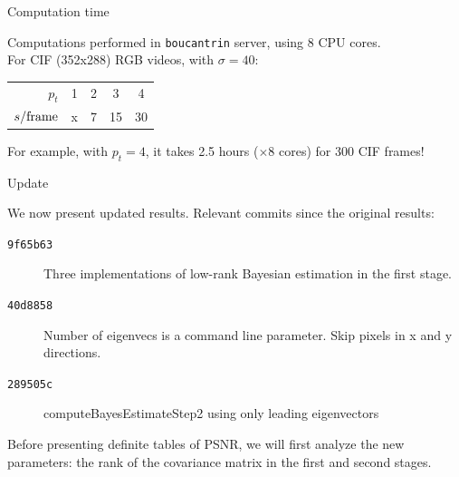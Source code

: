 \documentclass[mathserif, 8pt]{beamer}
\begin{document}
\begin{frame}{Computation time}

	Computations performed in \texttt{boucantrin} server, using 8 CPU cores.\\
	For CIF (352x288) RGB videos, with $\sigma = 40$: 

	\bigskip

	\begin{center}
	\begin{tabular}{r | c c c c}
		$p_t$ & 1 & 2 & 3 & 4 \\
		$s/\textnormal{frame}$ & x & 7 & 15 & 30 \\
	\end{tabular}
	\end{center}

	\vspace{2cm}

	For example, with $p_t = 4$, it takes 2.5 hours ($\times 8$ cores) for 300 CIF frames!

\end{frame}
% 
% 

\begin{frame}{Update}

	We now present updated results. Relevant commits since the original results: 
	\begin{description}
		\item[{\tt 9f65b63}] Three implementations of low-rank Bayesian estimation in the first stage.
		\item[{\tt 40d8858}] Number of eigenvecs is a command line parameter. Skip pixels in x and y directions.
		\item[{\tt 289505c}] computeBayesEstimateStep2 using only leading eigenvectors
	\end{description}

	\bigskip

	\bigskip

	\bigskip

	Before presenting definite tables of PSNR, we will first analyze the new
	parameters: the rank of the covariance matrix in the first and second stages.

\end{frame}
% 
% 
\end{document}
